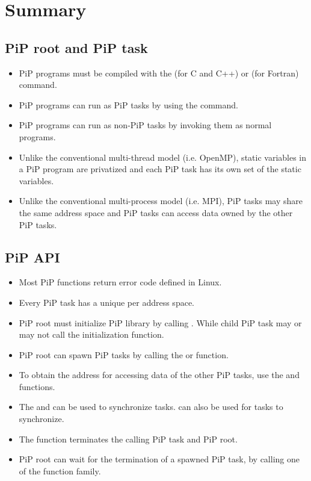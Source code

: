 
\section{Summary}

\subsection*{PiP root and PiP task}

\begin{itemize}
\item PiP programs must be compiled with the  
  (for C and C++) or  (for Fortran) command.
\item PiP programs can run as PiP tasks by using the
   command. 
\item PiP programs can run as non-PiP tasks by invoking them as normal
  programs.
\item Unlike the conventional multi-thread model (i.e. OpenMP), static
  variables in a PiP program are privatized and each PiP task has its
  own set of the static variables.
\item Unlike the conventional multi-process model (i.e. MPI), PiP
  tasks may share the same address space and PiP tasks can access data
  owned by the other PiP tasks. 
\end{itemize}

\subsection*{PiP API}

\begin{itemize}
\item Most PiP functions return error code defined in Linux.
\item Every PiP task has a unique {\PIPID} per address space.
\item PiP root must initialize PiP library by calling
  . While child PiP task may or may not call the
  initialization function.
\item PiP root can spawn PiP tasks by calling the
   or  function.
\item To obtain the address for accessing data of the other PiP tasks,
  use the  and
   functions.  
\item The  and 
  can be used to synchronize tasks.  can
  also be used for tasks to synchronize.
\item The  function terminates the calling PiP
  task and PiP root.
\item PiP root can wait for the termination of a spawned PiP task, by
  calling one of the  function family.
\end{itemize}
 
